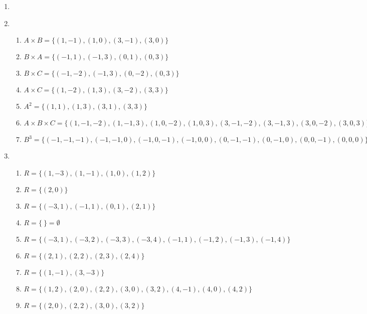 \documentclass[a4paper]{article}
\begin{document}
\begin{enumerate}

\item 

\item \ %

  \begin{enumerate}
  \item $A \times B = \{(1,-1), (1,0), (3,-1), (3,0)\}$
  \item $B \times A = \{(-1,1), (-1,3), (0,1), (0,3)\}$
  \item $B \times C = \{(-1,-2), (-1,3), (0,-2), (0,3)\}$
  \item $A \times C = \{(1,-2), (1,3), (3,-2), (3,3)\}$
  \item $A^2 = \{(1,1), (1,3), (3,1), (3,3)\}$
  \item $A \times B \times C = \{(1,-1,-2), (1,-1,3), (1,0,-2),
    (1,0,3), (3,-1,-2), (3,-1,3), (3,0,-2), (3,0,3)\}$
  \item $B^3 = \{(-1,-1,-1), (-1,-1,0), (-1,0,-1), (-1,0,0),
    (0,-1,-1), (0,-1,0), (0,0,-1), (0,0,0)\}$
  \end{enumerate}

\item \ %

  \begin{enumerate}
  \item $R=\{(1,-3), (1,-1), (1,0), (1,2)\}$ %
  \item $R=\{(2,0)\}$ %
  \item $R=\{(-3,1), (-1,1), (0,1), (2,1)\}$ %
  \item $R=\{\ \}=\emptyset$ %
  \item $R=\{(-3,1), (-3,2), (-3,3), (-3,4), (-1,1), (-1,2), (-1,3), (-1,4)\}$ %
  \item $R=\{(2,1), (2,2), (2,3), (2,4)\}$ %
  \item $R=\{(1,-1), (3,-3)\}$ %
  \item $R=\{(1,2), (2,0), (2,2), (3,0), (3,2), (4,-1), (4,0),
    (4,2)\}$ %
  \item $R=\{(2,0), (2,2), (3,0), (3,2)\}$ %
  \end{enumerate}


\end{enumerate}
\end{document}
